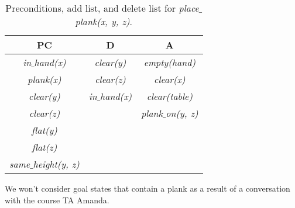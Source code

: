 \documentclass[11pt, letterpaper]{hw}
\begin{document}
\begin{enumerate}
\begin{table}[H]
\centering
{\renewcommand{\arraystretch}{1.2}%
\begin{tabular}{| c | c | c |}
\hline
\textbf{PC} & \textbf{D} & \textbf{A}\\
\hline
\textit{in$\_$hand(x)} & \textit{clear(y)}& \textit{empty(hand)}\\ \hline
\textit{plank(x)}& \textit{clear(z)} &  \textit{clear(x)}\\ \hline
\textit{clear(y)} & \textit{in$\_$hand(x)}& \textit{clear(table)}\\ \hline
\textit{clear(z)} &  &  \textit{plank$\_$on(y, z)}\\ \hline
\textit{flat(y)} & & \\ \hline
\textit{flat(z)} &  &  \\ \hline
\textit{same$\_$height(y, z)} & & \\ \hline
\end{tabular}}
\caption{Preconditions, add list, and delete list for \textit{place$\_$plank(x, y, z)}.}
\end{table}

We won't consider goal states that contain a plank as a result of a conversation with the course TA Amanda.

\end{enumerate}
\newpage
\end{document}
